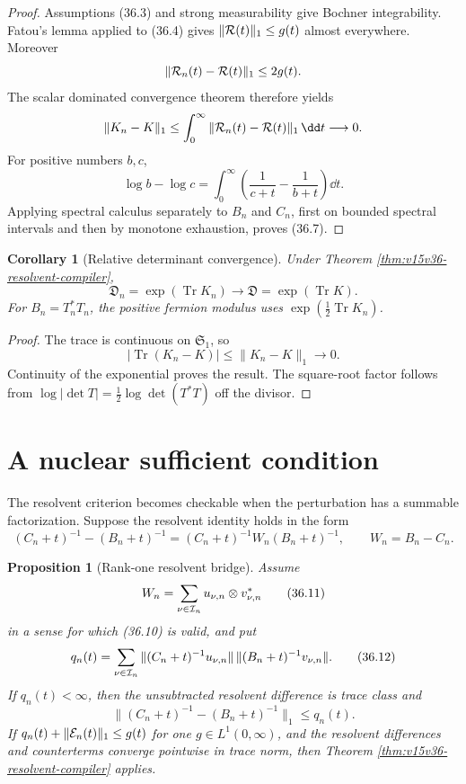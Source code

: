 \documentclass[11pt]{article}
\newtheorem{proposition}[theorem]{Proposition}
\newtheorem{corollary}[theorem]{Corollary}
\theoremstyle{remark}
\begin{document}
\begin{proof}
Assumptions (36.3) and strong measurability give Bochner
integrability.  Fatou's lemma applied to (36.4) gives
\(\|{\cal R}(t)\|_1\leq g(t)\) almost everywhere.  Moreover
\[
 \|{\cal R}_n(t)-{\cal R}(t)\|_1\leq2g(t).
\]
The scalar dominated convergence theorem therefore yields
\[
 \|K_n-K\|_1
 \leq\int_0^\infty
       \|{\cal R}_n(t)-{\cal R}(t)\|_1\,\dd t
 \longrightarrow0.
\]
For positive numbers \(b,c\),
\[
 \log b-\log c
 =\int_0^\infty\left(\frac1{c+t}-\frac1{b+t}\right)\dd t.
                                                               \tag{36.8}
\]
Applying spectral calculus separately to \(B_n\) and \(C_n\),
first on bounded spectral intervals and then by monotone exhaustion,
proves (36.7).
\end{proof}

\begin{corollary}[Relative determinant convergence]
\label{cor:v15v36-det-convergence}
Under Theorem \ref{thm:v15v36-resolvent-compiler},
\[
 {\mathfrak D}_n=\exp(\operatorname{Tr}K_n)
 \longrightarrow
 {\mathfrak D}=\exp(\operatorname{Tr}K).                  \tag{36.9}
\]
For \(B_n=T_n^*T_n\), the positive fermion modulus uses
\(\exp(\tfrac12\operatorname{Tr}K_n)\).
\end{corollary}

\begin{proof}
The trace is continuous on \({\mathfrak S}_1\), so
\[
 |\operatorname{Tr}(K_n-K)|\leq\|K_n-K\|_1\to0.
\]
Continuity of the exponential proves the result.  The square-root
factor follows from
\(\log|\det T|=\tfrac12\log\det(T^*T)\) off the divisor.
\end{proof}

\section{A nuclear sufficient condition}

The resolvent criterion becomes checkable when the perturbation has
a summable factorization.  Suppose the resolvent identity holds in
the form
\[
 (C_n+t)^{-1}-(B_n+t)^{-1}
 =(C_n+t)^{-1}W_n(B_n+t)^{-1},\qquad W_n=B_n-C_n.       \tag{36.10}
\]

\begin{proposition}[Rank-one resolvent bridge]
\label{prop:v15v36-nuclear-bridge}
Assume
\[
 W_n=\sum_{\nu\in{\cal I}_n}u_{\nu,n}\otimes v_{\nu,n}^*
                                                               \tag{36.11}
\]
in a sense for which (36.10) is valid, and put
\[
 q_n(t)=
 \sum_{\nu\in{\cal I}_n}
 \|(C_n+t)^{-1}u_{\nu,n}\|\,
 \|(B_n+t)^{-1}v_{\nu,n}\|.                              \tag{36.12}
\]
If \(q_n(t)<\infty\), then the unsubtracted resolvent difference is
trace class and
\[
 \boxed{
 \|(C_n+t)^{-1}-(B_n+t)^{-1}\|_1\leq q_n(t).}            \tag{36.13}
\]
If \(q_n(t)+\|{\cal E}_n(t)\|_1\leq g(t)\) for one
\(g\in L^1(0,\infty)\), and the resolvent differences and
counterterms converge pointwise in trace norm, then Theorem
\ref{thm:v15v36-resolvent-compiler} applies.
\end{proposition}
\end{document}
